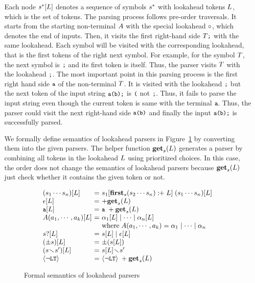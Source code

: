 Each node \( s^*[L] \) denotes a sequence of symbols \( s^* \) with
lookahead tokens \( L \), which is the set of tokens.
The parsing process follows pre-order traversals.
It starts from the starting non-terminal \( A \) with the special
lookahead \( \circ \), which denotes the end of inputs.
Then, it visits the first right-hand side \( T \texttt{\small;} \) with the same lookahead.
Each symbol will be visited with the corresponding lookahead, that is the
first tokens of the right next symbol.
For example, for the symbol \( T \), the next symbol is \( \texttt{\small;} \)
and its first token is itself. Thus, the parser visits \( T \)
with the lookahead \( \texttt{\small;} \). The most important point in this parsing process
is the first right hand side \( \texttt{\small a} \) of the non-terminal \( T \).
It is visited with the lookahead \( \texttt{\small;} \) but the next token of the input string
\( \texttt{\small a(b);} \) is \( \texttt{\small(} \) not \( \texttt{\small;} \).
Thus, it fails to parse the input string even though the current token is
same with the terminal \( \texttt{\small a} \).
Thus, the parser could visit the next right-hand side \( \texttt{\small a}\texttt{\small(}\texttt{\small b}\texttt{\small)} \)
and finally the input \( \texttt{\small a(b);} \) is successfully parsed.

We formally define semantics of lookahead parsers
in Figure~\ref{fig:laparser} by converting them into the given parsers.
The helper function \( \textbf{get}_s(L) \) generates a parser by combining all
tokens in the lookahead \( L \) using prioritized choices.
In this case, the order does not change the semantics of lookahead parsers
because \( \textbf{get}_s(L) \) just check whether it contains the given token or not.

\begin{figure}
\centering
\[
  \begin{array}{l@{~}c@{~}l}
    (\symb_1 \cdots \symb_n)[\la] &=&
    \symb_1[\symbfirst{\symb_2 \cdots \symb_n} \firstplus \la] \;
    (\symb_1 \cdots \symb_n)[\la]\\
    \epsilon[\la] &=& +\getlap{\la}\\
    \T{a}[\la] &=& \T{a} \; +\getlap{\la} \\
    \NT{A}(\argument_1, \cdots, \argument_k)[\la] &=&
    \rhs_1[\la] \mid \cdots \mid \rhs_n[\la]\\
    && \text{where} \; \NT{A}(\argument_1, \cdots, \argument_k) =
    \rhs_1 \mid \cdots \mid \rhs_n\\

    \symb?[\la] &=& \symb[\la] \mid \epsilon[\la]\\
    (\pm\symb)[\la] &=& \pm(\symb[\la]) \\
    (\symb \butnot \symb')[\la] &=& \symb[\la] \butnot \symb'\\
    \nolt &=& \nolt \; +\getlap{\la}\\
  \end{array}
\]
\caption{Formal semantics of lookahead parsers}
\label{fig:laparser}
\end{figure}

